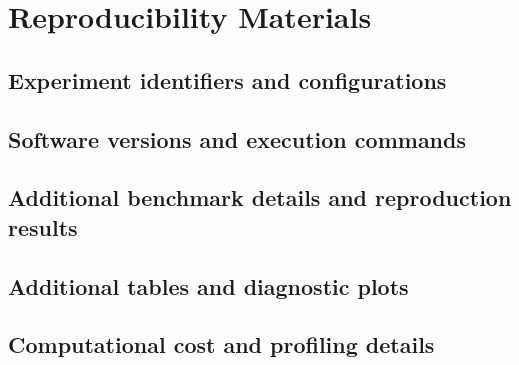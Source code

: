 \appendix
\chapter{Reproducibility Materials}
\label{app:reproducibility}


\section{Experiment identifiers and configurations}
\label{sec:appendix-configurations}

\section{Software versions and execution commands}
\label{sec:appendix-environment}

\section{Additional benchmark details and reproduction results}
\label{sec:appendix-benchmarks}

\section{Additional tables and diagnostic plots}
\label{sec:appendix-diagnostics}

\section{Computational cost and profiling details}
\label{sec:appendix-profiling}
